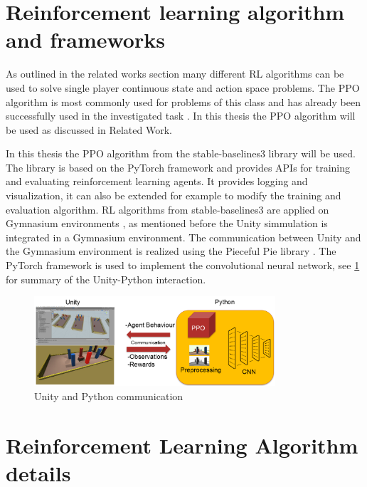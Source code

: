 

\section{Reinforcement learning algorithm and frameworks}

As outlined in the related works section many different RL algorithms can be used to solve single player continuous state and action space problems. The PPO algorithm is most commonly used for problems of this class and has already been successfully used in the investigated task \autocite{maximilian}. In this thesis the PPO algorithm will be used as discussed in Related Work.

In this thesis the PPO algorithm from the stable-baselines3 library \autocite{sb3} will be used. The library is based on the PyTorch framework and provides APIs for training and evaluating reinforcement learning agents. It provides logging and visualization, it can also be extended for example to modify the training and evaluation algorithm. RL algorithms from stable-baselines3 are applied on Gymnasium environments \autocite{gymnasium}, as mentioned before the Unity simmulation is integrated in a Gymnasium environment. The communication between Unity and the Gymnasium environment is realized using the Pieceful Pie library \autocite{peacefulpie}. The PyTorch framework is used to implement the convolutional neural network, see \ref{fig:unitycommunication} for summary of the Unity-Python interaction.

\begin{figure}
     \centering
     \includegraphics[width=0.8\textwidth]{Bilder/unity_communication.png}
     \caption{Unity and Python communication}
     \label{fig:unitycommunication}
\end{figure}


\section{Reinforcement Learning Algorithm details}


